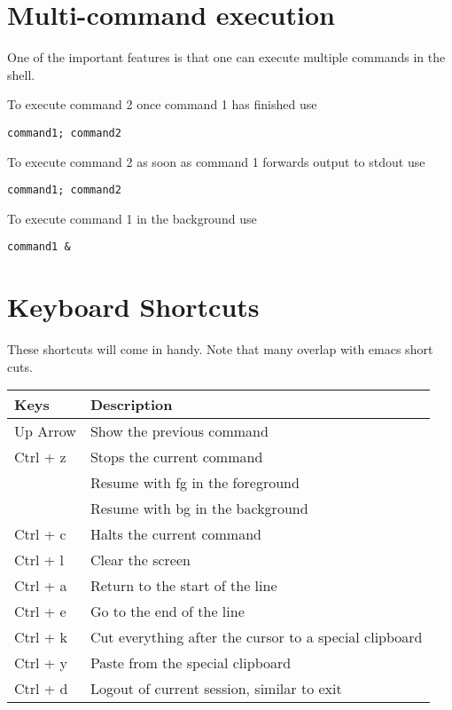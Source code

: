 \section{Multi-command execution}

One of the important features is that one can execute multiple
commands in the shell.

To execute command 2 once command 1 has finished use

\begin{verbatim}
command1; command2
\end{verbatim}

To execute command 2 as soon as command 1 forwards output to stdout use

\begin{verbatim}
command1; command2
\end{verbatim}

To execute command 1 in the background use

\begin{verbatim}
command1 &
\end{verbatim}



\section{Keyboard Shortcuts}\label{keyboard-shortcuts}

These shortcuts will come in handy. Note that many overlap with emacs
short cuts.

\begin{tabular}{ll}
Keys     & Description  \\
\hline
Up Arrow & Show the previous command\\
Ctrl + z & Stops the current command  \\
         & Resume with fg in the foreground \\
         & Resume with bg in the background \\
Ctrl + c & Halts the current command\\
Ctrl + l & Clear the screen\\
Ctrl + a & Return to the start of the line\\
Ctrl + e & Go to the end of the line\\
Ctrl + k & Cut everything after the cursor to a special clipboard\\
Ctrl + y & Paste from the special clipboard \\
Ctrl + d & Logout of current session, similar to exit \\
\end{tabular}

